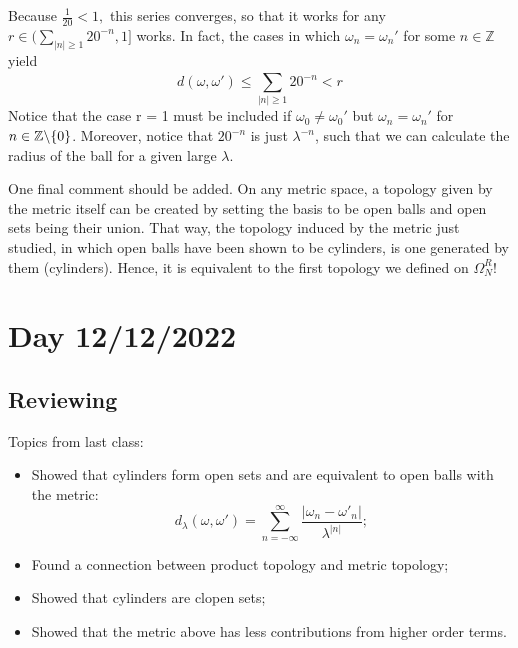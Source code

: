 \documentclass{article}
\newcommand\SLash{\char`\\}
\begin{document}
  Because $\displaystyle \frac{1}{20} < 1,$ this series converges, so that it works for any $r\in\biggl(\sum\limits_{|n|\geq{1}}^{}20^{-n}, 1\biggr]$ works.
In fact, the cases in which $\omega_{n} = \omega_{n}'$ for some $n\in \mathbb{Z}$ yield
  $$
    d(\omega, \omega')\leq \sum\limits_{|n|\geq{1}}^{}20^{-n} < r
  $$
Notice that the case r = 1 must be included if $\omega_{0}\neq \omega_{0}'$ but $\omega_{n} = \omega_{n}'$ for $n\in \mathbb{Z}\SLash \{ 0\} $. 
Moreover, notice that $20^{-n}$ is just $\lambda^{-n}$, such that we can calculate the radius of the ball for a given large $\lambda.$

  One final comment should be added. On any metric space, a topology given by the metric itself can be created by setting
the basis to be open balls and open sets being their union. That way, the topology induced by the metric just studied, in which
open balls have been shown to be cylinders, is one generated by them (cylinders). Hence, it is equivalent to the first topology we
defined on $\Omega_{N}^{R}!$
\newpage

\section{Day 12/12/2022}
\subsection{Reviewing}
Topics from last class:
  \begin{itemize}
    \item Showed that cylinders form open sets and are equivalent to open balls with the metric:
  $$
  d_{\lambda}(\omega, \omega') = \sum_{n=-\infty}^{\infty}\frac{|\omega _{n} - \omega' _{n}|}{\lambda ^{|n|}};
  $$
  \item Found a connection between product topology and metric topology;
  \item Showed that cylinders are clopen sets;
  \item Showed that the metric above has less contributions from higher order terms.
  \end{itemize}
\end{document}
